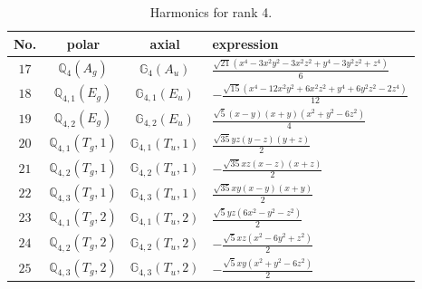\documentclass[fleqn,8pt,landscape]{jsarticle}
\begin{document}
\begin{table}[ht!]
\begin{center}
\caption{Harmonics for rank 4.}
\renewcommand{\arraystretch}{1.3}
\begin{tabular}{cccl} \hline \hline
No. & polar & axial & expression \\ \hline
$ 17 $ & $ \mathbb{Q}_{4}(A_{g}) $ & $ \mathbb{G}_{4}(A_{u}) $ & $ \frac{\sqrt{21} \left(x^{4} - 3 x^{2} y^{2} - 3 x^{2} z^{2} + y^{4} - 3 y^{2} z^{2} + z^{4}\right)}{6} $ \\
$ 18 $ & $ \mathbb{Q}_{4,1}(E_{g}) $ & $ \mathbb{G}_{4,1}(E_{u}) $ & $ - \frac{\sqrt{15} \left(x^{4} - 12 x^{2} y^{2} + 6 x^{2} z^{2} + y^{4} + 6 y^{2} z^{2} - 2 z^{4}\right)}{12} $ \\
$ 19 $ & $ \mathbb{Q}_{4,2}(E_{g}) $ & $ \mathbb{G}_{4,2}(E_{u}) $ & $ \frac{\sqrt{5} \left(x - y\right) \left(x + y\right) \left(x^{2} + y^{2} - 6 z^{2}\right)}{4} $ \\
$ 20 $ & $ \mathbb{Q}_{4,1}(T_{g},1) $ & $ \mathbb{G}_{4,1}(T_{u},1) $ & $ \frac{\sqrt{35} y z \left(y - z\right) \left(y + z\right)}{2} $ \\
$ 21 $ & $ \mathbb{Q}_{4,2}(T_{g},1) $ & $ \mathbb{G}_{4,2}(T_{u},1) $ & $ - \frac{\sqrt{35} x z \left(x - z\right) \left(x + z\right)}{2} $ \\
$ 22 $ & $ \mathbb{Q}_{4,3}(T_{g},1) $ & $ \mathbb{G}_{4,3}(T_{u},1) $ & $ \frac{\sqrt{35} x y \left(x - y\right) \left(x + y\right)}{2} $ \\
$ 23 $ & $ \mathbb{Q}_{4,1}(T_{g},2) $ & $ \mathbb{G}_{4,1}(T_{u},2) $ & $ \frac{\sqrt{5} y z \left(6 x^{2} - y^{2} - z^{2}\right)}{2} $ \\
$ 24 $ & $ \mathbb{Q}_{4,2}(T_{g},2) $ & $ \mathbb{G}_{4,2}(T_{u},2) $ & $ - \frac{\sqrt{5} x z \left(x^{2} - 6 y^{2} + z^{2}\right)}{2} $ \\
$ 25 $ & $ \mathbb{Q}_{4,3}(T_{g},2) $ & $ \mathbb{G}_{4,3}(T_{u},2) $ & $ - \frac{\sqrt{5} x y \left(x^{2} + y^{2} - 6 z^{2}\right)}{2} $ \\
 \hline \hline
\end{tabular}
\end{center}
\end{table}
\end{document}
